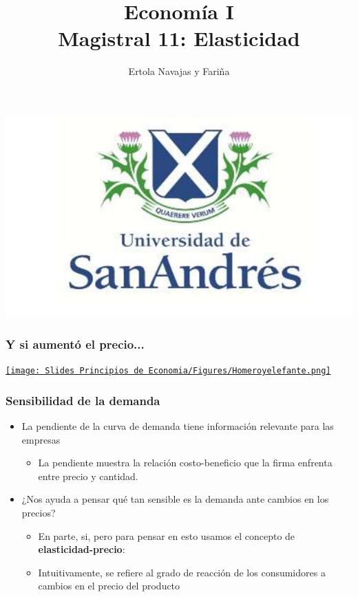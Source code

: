 \documentclass{beamer}
\title[Economía I]{Economía I \vspace{4mm}
\\ Magistral 11: Elasticidad}
\date{}
\author[Ertola Navajas y Fariña]{Ertola Navajas y Fariña}
\institute[]{Universidad de San Andrés}
\begin{document}
\begin{frame}
\titlepage
\centering
\includegraphics[scale=0.2]{Slides Principios de Economia/Figures/logoUDESA.jpg} 
\end{frame}

\begin{frame}
\frametitle{Y si aumentó el precio...}
\centering
\href{https://econ.video/2017/08/02/the-simpsons-bart-gets-an-elephant/}{\texttt{[image: Slides Principios de Economia/Figures/Homeroyelefante.png]}}
\end{frame}


\begin{frame}
\frametitle{Sensibilidad de la demanda}
\begin{itemize}
    \item La pendiente de la curva de demanda tiene información relevante para las empresas\vspace{2mm}
    \begin{itemize}
        \item La pendiente muestra la relación costo-beneficio que la firma enfrenta entre precio y cantidad.\vspace{4mm}
     \end{itemize}
    \item ¿Nos ayuda a pensar qué tan sensible es la demanda ante cambios en los precios?\vspace{2mm}
    \begin{itemize}
        \item En parte, si, pero para pensar en esto usamos el concepto de \textbf{elasticidad-precio}: \\\vspace{2mm}
      \item Intuitivamente, se refiere al grado de reacción de los consumidores a cambios en el precio del producto 
    \end{itemize}
    \end{itemize}
\end{frame}
\end{document}
